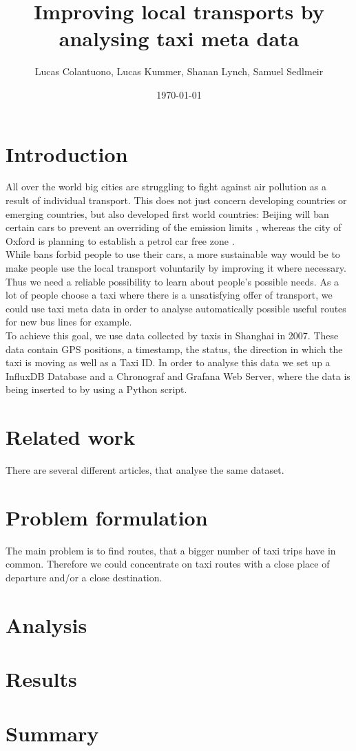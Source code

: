 \documentclass[11pt,final,a4paper,onecolumn,romanappendices]{IEEEtran}
\author{Lucas Colantuono, Lucas Kummer, Shanan Lynch, Samuel Sedlmeir}
\title{Improving local transports by analysing taxi meta data}
\date{\today}
\begin{document}
\maketitle

\tableofcontents
\newpage

\begin{abstract}
 
\end{abstract}

\section{Introduction}
\label{sec:Introduction}
All over the world big cities are struggling to fight against air pollution as a result of individual transport. This does not just concern developing countries or emerging countries, but also developed first world countries: Beijing will ban certain cars to prevent an overriding of the emission limits \cite{beij}, whereas the city of Oxford is planning to establish a petrol car free zone \cite{oxfo}. \\
While bans forbid people to use their cars, a more sustainable way would be to make people use the local transport voluntarily by improving it where necessary. Thus we need a reliable possibility to learn about people's possible needs. As a lot of people choose a taxi where there is a unsatisfying offer of transport, we could use taxi meta data in order to analyse automatically possible useful routes for new bus lines for example. \\
To achieve this goal, we use data collected by taxis in Shanghai in 2007. These data contain GPS positions, a timestamp, the status, the direction in which the taxi is moving as well as a Taxi ID. In order to analyse this data we set up a InfluxDB Database and a Chronograf and Grafana Web Server, where the data is being inserted to by using a Python script.
\section{Related work}
There are several different articles, that analyse the same dataset.
\section{Problem formulation}
The main problem is to find routes, that a bigger number of taxi trips have in common. Therefore we could concentrate on taxi routes with a close place of departure and/or a close destination.
\section{Analysis}
\section{Results}
\section{Summary}

\newpage


\end{document}
